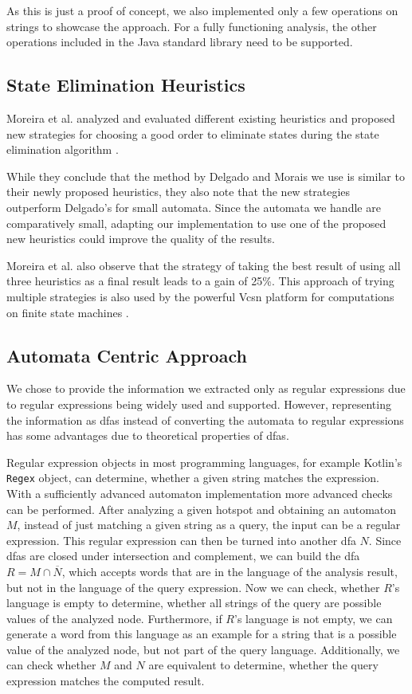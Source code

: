 As this is just a proof of concept, we also implemented only a few operations on strings to showcase the approach. For a fully functioning analysis, the other operations included in the Java standard library need to be supported.

\subsection{State Elimination Heuristics}

Moreira et al. analyzed and evaluated different existing heuristics and proposed new strategies for choosing a good order to eliminate states during the state elimination algorithm \cite{moreira_heuristics}.

While they conclude that the method by Delgado and Morais \cite{delgado} we use is similar to their newly proposed heuristics, they also note that the new strategies outperform Delgado's for small automata. Since the automata we handle are comparatively small, adapting our implementation to use one of the proposed new heuristics could improve the quality of the results.

Moreira et al. also observe that the strategy of taking the best result of using all three heuristics as a final result leads to a gain of 25\%. This approach of trying multiple strategies is also used by the powerful Vcsn platform for computations on finite state machines \cite{vcsn}.

\subsection{Automata Centric Approach}

We chose to provide the information we extracted only as regular expressions due to regular expressions being widely used and supported.
However, representing the information as \acp{dfa} instead of converting the automata to regular expressions has some advantages due to theoretical properties of \acp{dfa}.

Regular expression objects in most programming languages, for example Kotlin's \lstinline|Regex| object, can determine, whether a given string matches the expression. With a sufficiently advanced automaton implementation more advanced checks can be performed.
After analyzing a given hotspot and obtaining an automaton $M$, instead of just matching a given string as a query, the input can be a regular expression. This regular expression can then be turned into another \ac{dfa} $N$.
Since \acp{dfa} are closed under intersection and complement, we can build the \ac{dfa} $R = M \cap \overline{N}$, which accepts words that are in the language of the analysis result, but not in the language of the query expression.
Now we can check, whether $R$'s language is empty to determine, whether all strings of the query are possible values of the analyzed node. Furthermore, if $R$'s language is not empty, we can generate a word from this language as an example for a string that is a possible value of the analyzed node, but not part of the query language.
Additionally, we can check whether $M$ and $N$ are equivalent to determine, whether the query expression matches the computed result.

